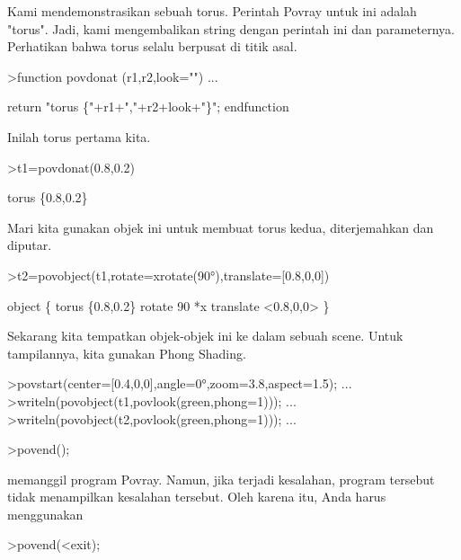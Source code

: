 \documentclass[a4paper,10pt]{article}
\begin{document}
\begin{eulernotebook}
\begin{eulercomment}
\begin{eulercomment}
\begin{eulercomment}
\begin{eulercomment}
\begin{eulercomment}
\begin{eulercomment}
\begin{eulercomment}
\begin{eulercomment}
\begin{eulercomment}
\begin{eulercomment}
\begin{eulercomment}
\begin{eulercomment}
\begin{eulercomment}
\begin{eulercomment}
\begin{eulercomment}
\begin{eulercomment}
\begin{eulercomment}
Kami mendemonstrasikan sebuah torus. Perintah Povray untuk ini adalah
"torus". Jadi, kami mengembalikan string dengan perintah ini dan
parameternya. Perhatikan bahwa torus selalu berpusat di titik asal.
\end{eulercomment}
\begin{eulerprompt}
>function povdonat (r1,r2,look="") ...
\end{eulerprompt}
\begin{eulerudf}
    return "torus \{"+r1+","+r2+look+"\}";
  endfunction
\end{eulerudf}
\begin{eulercomment}
Inilah torus pertama kita.
\end{eulercomment}
\begin{eulerprompt}
>t1=povdonat(0.8,0.2)
\end{eulerprompt}
\begin{euleroutput}
  torus \{0.8,0.2\}
\end{euleroutput}
\begin{eulercomment}
Mari kita gunakan objek ini untuk membuat torus kedua, diterjemahkan
dan diputar.
\end{eulercomment}
\begin{eulerprompt}
>t2=povobject(t1,rotate=xrotate(90°),translate=[0.8,0,0])
\end{eulerprompt}
\begin{euleroutput}
  object \{ torus \{0.8,0.2\}
   rotate 90 *x 
   translate <0.8,0,0>
   \}
\end{euleroutput}
\begin{eulercomment}
Sekarang kita tempatkan objek-objek ini ke dalam sebuah scene. Untuk
tampilannya, kita gunakan Phong Shading.
\end{eulercomment}
\begin{eulerprompt}
>povstart(center=[0.4,0,0],angle=0°,zoom=3.8,aspect=1.5); ...
>writeln(povobject(t1,povlook(green,phong=1))); ...
>writeln(povobject(t2,povlook(green,phong=1))); ...
\end{eulerprompt}
\begin{eulercomment}
\textgreater{}povend();

memanggil program Povray. Namun, jika terjadi kesalahan, program
tersebut tidak menampilkan kesalahan tersebut. Oleh karena itu, Anda
harus menggunakan

\textgreater{}povend(\textless{}exit);


\end{eulercomment}
\end{eulercomment}
\end{eulercomment}
\end{eulercomment}
\end{eulercomment}
\end{eulercomment}
\end{eulercomment}
\end{eulercomment}
\end{eulercomment}
\end{eulercomment}
\end{eulercomment}
\end{eulercomment}
\end{eulercomment}
\end{eulercomment}
\end{eulercomment}
\end{eulercomment}
\end{eulercomment}
\end{eulernotebook}
\end{document}
